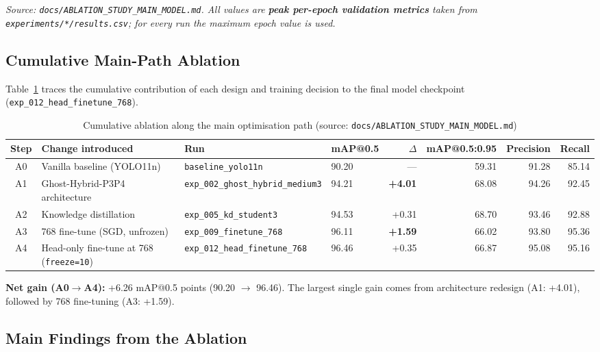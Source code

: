 \documentclass[11pt,a4paper]{article}
\begin{document}
\textit{Source: \texttt{docs/ABLATION\_STUDY\_MAIN\_MODEL.md}. All values are
\textbf{peak per-epoch validation metrics} taken from \texttt{experiments/*/results.csv};
for every run the maximum epoch value is used.}

\subsection{Cumulative Main-Path Ablation}

Table~\ref{tab:cumulative_ablation} traces the cumulative contribution of each design
and training decision to the final model checkpoint
(\texttt{exp\_012\_head\_finetune\_768}).

\begin{table}[H]
\centering
\caption{Cumulative ablation along the main optimisation path (source: \texttt{docs/ABLATION\_STUDY\_MAIN\_MODEL.md})}
\label{tab:cumulative_ablation}
\begin{tabular}{clllrrrr}
\toprule
\textbf{Step} & \textbf{Change introduced} & \textbf{Run} &
\textbf{mAP@0.5} & \textbf{$\Delta$} &
\textbf{mAP@0.5:0.95} & \textbf{Precision} & \textbf{Recall} \\
\midrule
A0 & Vanilla baseline (YOLO11n) &
  \texttt{baseline\_yolo11n} & 90.20 & --- & 59.31 & 91.28 & 85.14 \\
A1 & Ghost-Hybrid-P3P4 architecture &
  \texttt{exp\_002\_ghost\_hybrid\_medium3} & 94.21 & \textbf{+4.01} & 68.08 & 94.26 & 92.45 \\
A2 & Knowledge distillation &
  \texttt{exp\_005\_kd\_student3} & 94.53 & +0.31 & 68.70 & 93.46 & 92.88 \\
A3 & 768 fine-tune (SGD, unfrozen) &
  \texttt{exp\_009\_finetune\_768} & 96.11 & \textbf{+1.59} & 66.02 & 93.80 & 95.36 \\
A4 & Head-only fine-tune at 768 (\texttt{freeze=10}) &
  \texttt{exp\_012\_head\_finetune\_768} & 96.46 & +0.35 & 66.87 & 95.08 & 95.16 \\
\bottomrule
\end{tabular}
\end{table}

\textbf{Net gain (A0$\to$A4):} +6.26 mAP@0.5 points (90.20 $\to$ 96.46). The largest
single gain comes from architecture redesign (A1: +4.01), followed by 768 fine-tuning
(A3: +1.59).

\subsection{Main Findings from the Ablation}
\end{document}

